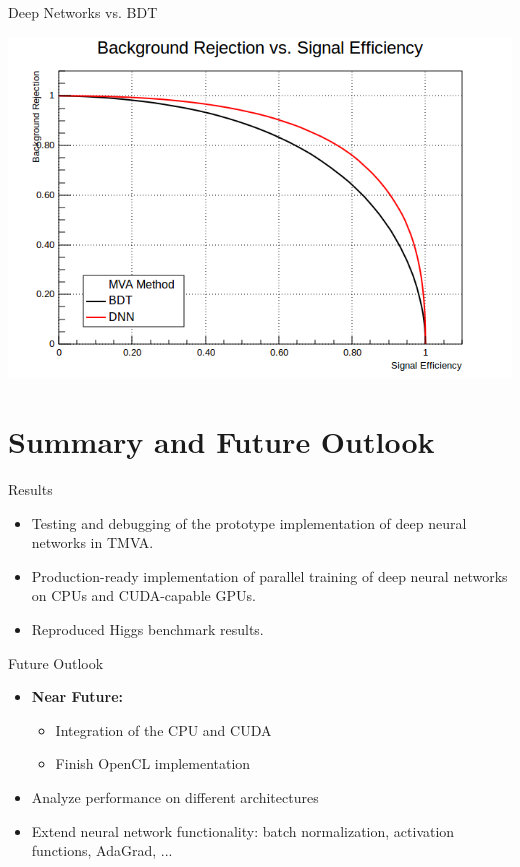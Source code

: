\documentclass{beamer}
\begin{document}
\begin{frame}{Deep Networks vs. BDT}
  \begin{center}
    \includegraphics[width=0.8\linewidth]{bdt_dnn}
 \end{center}
\end{frame}

\section{Summary and Future Outlook}
\begin{frame}{Results}
  \begin{itemize}
    \item Testing and debugging of the prototype implementation
      of deep neural networks in TMVA.
    \item Production-ready implementation of parallel training
      of deep neural networks on CPUs and CUDA-capable GPUs.
    \item Reproduced Higgs benchmark results.
  \end{itemize}
\end{frame}
\begin{frame}{Future Outlook}
  \begin{itemize}
  \item \textbf{Near Future:}
    \begin{itemize}
    \item Integration of the CPU and CUDA
    \item Finish OpenCL implementation
    \end{itemize}
    \item Analyze performance on different architectures
    \item Extend neural network functionality: batch normalization, activation
      functions, AdaGrad, ...
  \end{itemize}
\end{frame}
\end{document}
